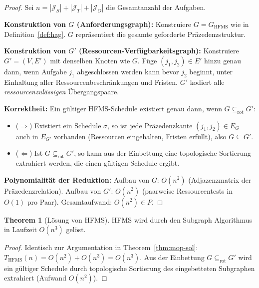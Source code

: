 ﻿\documentclass[a4paper,12pt]{article}
\theoremstyle{definition}
\newtheorem{theorem}{Theorem}[section]
\begin{document}
\begin{proof}
Sei $n = |\mathcal{J}_S| + |\mathcal{J}_T| + |\mathcal{J}_O|$ die Gesamtanzahl der Aufgaben.

\textbf{Konstruktion von $G$ (Anforderungsgraph):}
Konstruiere $G = G_{\mathrm{HFMS}}$ wie in Definition~\ref{def:hag}.
$G$ repräsentiert die gesamte geforderte Präzedenzstruktur.

\textbf{Konstruktion von $G'$ (Ressourcen-Verfügbarkeitsgraph):}
Konstruiere $G' = (V, E')$ mit denselben Knoten wie $G$.
Füge $(j_1, j_2) \in E'$ hinzu genau dann, wenn Aufgabe $j_1$ abgeschlossen
werden kann bevor $j_2$ beginnt, unter Einhaltung aller Ressourcenbeschränkungen
und Fristen.
$G'$ kodiert alle \emph{ressourcenzulässigen} Übergangspaare.

\textbf{Korrektheit:}
Ein gültiger HFMS-Schedule existiert genau dann, wenn $G \subseteq_{\mathrm{rot}} G'$:
\begin{itemize}
    \item ($\Rightarrow$) Existiert ein Schedule $\sigma$, so ist jede Präzedenzkante
          $(j_1, j_2) \in E_G$ auch in $E_{G'}$ vorhanden (Ressourcen eingehalten,
          Fristen erfüllt), also $G \subseteq G'$.
    \item ($\Leftarrow$) Ist $G \subseteq_{\mathrm{rot}} G'$, so kann aus der Einbettung
          eine topologische Sortierung extrahiert werden, die einen gültigen Schedule ergibt.
\end{itemize}

\textbf{Polynomialität der Reduktion:}
Aufbau von $G$: $O(n^2)$ (Adjazenzmatrix der Präze\-denzrelation).
Aufbau von $G'$: $O(n^2)$ (paarweise Ressourcentests in $O(1)$ pro Paar).
Gesamtaufwand: $O(n^2) \in P$.
\end{proof}

\begin{theorem}[Lösung von HFMS]
\label{thm:hfms-sol}
HFMS wird durch den Subgraph Algorithmus in Laufzeit $O(n^3)$ gelöst.
\end{theorem}

\begin{proof}
Identisch zur Argumentation in Theorem~\ref{thm:mop-sol}:
$T_{\mathrm{HFMS}}(n) = O(n^2) + O(n^3) = O(n^3)$.
Aus der Einbettung $G \subseteq_{\mathrm{rot}} G'$ wird ein gültiger Schedule
durch topologische Sortierung des eingebetteten Subgraphen extrahiert (Aufwand $O(n^2)$).
\end{proof}

\end{document}
